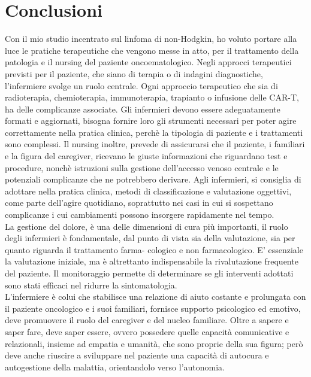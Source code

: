 \section*{Conclusioni}

Con il mio studio incentrato sul linfoma di non-Hodgkin, ho voluto portare alla luce le pratiche terapeutiche 
che vengono messe in atto, per il trattamento della patologia e il nursing del paziente oncoematologico. 
Negli approcci terapeutici previsti per il paziente, che siano di terapia o di indagini diagnostiche, l'infermiere 
svolge un ruolo centrale.
Ogni approccio terapeutico che sia di radioterapia, chemioterapia, immunoterapia, trapianto o infusione delle CAR-T, 
ha delle complicanze associate. 
Gli infermieri devono essere adeguatamente formati e aggiornati, bisogna fornire loro gli strumenti necessari per poter 
agire correttamente nella pratica clinica, perchè la tipologia di paziente e i trattamenti sono complessi. 
Il nursing inoltre, prevede di assicurarsi che il paziente, i familiari e la figura del caregiver, ricevano le 
giuste informazioni che riguardano test e procedure, nonchè istruzioni sulla gestione dell’accesso venoso centrale e le
potenziali complicanze che ne potrebbero derivare.
Agli infermieri, si consiglia di adottare nella pratica clinica, metodi di classificazione e valutazione oggettivi, 
come parte dell’agire quotidiano, soprattutto nei casi in cui si sospettano complicanze i
cui cambiamenti possono insorgere rapidamente nel tempo.\\
La gestione del dolore, è una delle dimensioni di cura più importanti, il ruolo degli infermieri è
fondamentale, dal punto di vista sia della valutazione, sia per quanto riguarda il trattamento farma-
cologico e non farmacologico. 
E' essenziale la valutazione iniziale, ma è altrettanto indispensabile la rivalutazione
frequente del paziente. Il monitoraggio permette di determinare se gli interventi adottati sono stati
efficaci nel ridurre la sintomatologia.\\
L’infermiere è colui che stabilisce una relazione di aiuto costante e prolungata con il paziente 
oncologico e i suoi familiari, fornisce supporto psicologico ed emotivo, deve promuovere il ruolo del
caregiver e del nucleo familiare. Oltre a sapere e saper fare, deve saper essere, ovvero possedere quelle 
capacità comunicative e relazionali, insieme ad empatia e umanità, che sono proprie della sua figura;
però deve anche riuscire a sviluppare nel paziente una capacità di autocura e autogestione della malattia, 
orientandolo verso l’autonomia.
